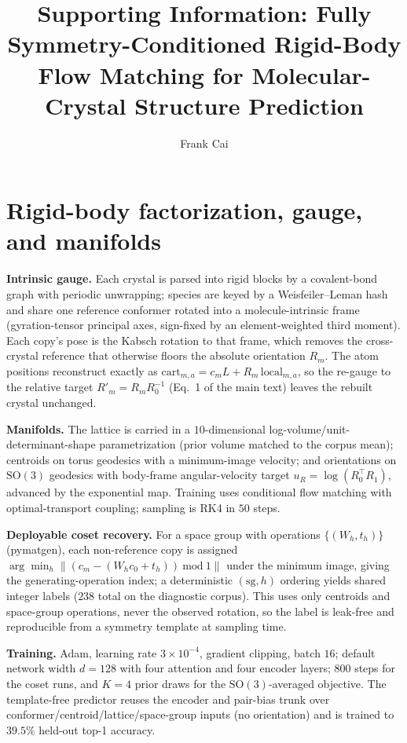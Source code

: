 \documentclass[journal=jcisd8,manuscript=suppinfo]{achemso}
\author{Frank Cai}
\affiliation{Purdue University, West Lafayette, Indiana 47907, United States}
\title{Supporting Information:
Fully Symmetry-Conditioned Rigid-Body Flow Matching for
Molecular-Crystal Structure Prediction}
\begin{document}
\section{Rigid-body factorization, gauge, and manifolds}\label{sisec:method}
\textbf{Intrinsic gauge.} Each crystal is parsed into rigid blocks by a
covalent-bond graph with periodic unwrapping; species are keyed by a
Weisfeiler--Leman hash and share one reference conformer rotated into a
molecule-intrinsic frame (gyration-tensor principal axes, sign-fixed by an
element-weighted third moment). Each copy's pose is the Kabsch rotation to that
frame, which removes the cross-crystal reference that otherwise floors the absolute
orientation $R_m$. The atom positions reconstruct exactly as
$\text{cart}_{m,a}=c_mL+R_m\,\text{local}_{m,a}$, so the re-gauge to the relative
target $R'_m=R_mR_0^{-1}$ (Eq.~1 of the main text) leaves the rebuilt crystal
unchanged.

\textbf{Manifolds.} The lattice is carried in a $10$-dimensional
log-volume/unit-determinant-shape parametrization (prior volume matched to the
corpus mean); centroids on torus geodesics with a minimum-image velocity; and
orientations on $\mathrm{SO}(3)$ geodesics with body-frame angular-velocity target
$u_R=\log(R_0^\top R_1)$, advanced by the exponential map. Training uses conditional
flow matching\cite{lipman2023flowmatching} with optimal-transport
coupling\cite{pooladian2023multisample}; sampling is RK4 in $50$ steps.

\textbf{Deployable coset recovery.} For a space group with operations
$\{(W_h,t_h)\}$ (pymatgen), each non-reference copy is assigned
$\arg\min_h \lVert (c_m-(W_hc_0+t_h))\ \mathrm{mod}\ 1\rVert$ under the minimum
image, giving the generating-operation index; a deterministic $(\text{sg},h)$
ordering yields shared integer labels ($238$ total on the diagnostic corpus). This
uses only centroids and space-group operations, never the observed rotation, so the
label is leak-free and reproducible from a symmetry template at sampling time.

\textbf{Training.} Adam, learning rate $3\times10^{-4}$, gradient clipping, batch
$16$; default network width $d{=}128$ with four attention and four encoder layers;
$800$ steps for the coset runs, and $K{=}4$ prior draws for the
$\mathrm{SO}(3)$-averaged objective. The template-free predictor reuses the encoder
and pair-bias trunk over conformer/centroid/lattice/space-group inputs (no
orientation) and is trained to $39.5\%$ held-out top-1 accuracy.
\end{document}
